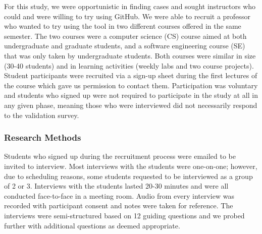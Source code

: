 For this study, we were opportunistic in finding cases and sought instructors who could and were willing to try using GitHub. We were able to recruit a professor who wanted to try using the tool in two different courses offered in the same semester. The two courses were a computer science (CS) course aimed at both undergraduate and graduate students, and a software engineering course (SE) that was only taken by undergraduate students. Both courses were similar in size (30-40 students) and in learning activities (weekly labs and two course projects). Student participants were recruited via a sign-up sheet during the first lectures of the course which gave us permission to contact them. Participation was voluntary and students who signed up were not required to participate in the study at all in any given phase, meaning those who were interviewed did not necessarily respond to the validation survey.


\subsubsection{Research Methods}
Students who signed up during the recruitment process were emailed to be invited to interview. Most interviews with the students were one-on-one; however, due to scheduling reasons, some students requested to be interviewed as a group of 2 or 3. Interviews with the students lasted 20-30 minutes and were all conducted face-to-face in a meeting room. Audio from every interview was recorded with participant consent and notes were taken for reference. The interviews were semi-structured based on 12 guiding questions and we probed further with additional questions as deemed appropriate. %

